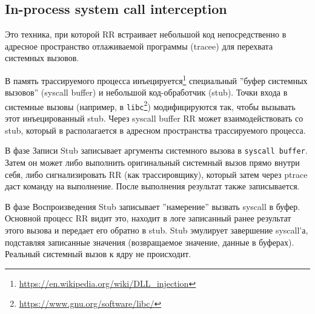 


\subsection{In-process system call interception}


Это техника, при которой RR встраивает небольшой код непосредственно
в адресное пространство отлаживаемой программы (tracee) для перехвата системных
вызовов.

В память трассируемого процесса
инъецируется\footnote{\url{https://en.wikipedia.org/wiki/DLL_injection}}
специальный ''буфер системных вызовов'' (syscall buffer) и небольшой
код-обработчик (stub). Точки входа в системные вызовы (например, в
\texttt{libc}\footnote{\url{https://www.gnu.org/software/libc/}})
модифицируются так, чтобы вызывать этот инъецированный stub. Через syscall
buffer RR может взаимодействовать со stub, который в располагается в адресном
пространства трассируемого процесса.

В фазе Записи Stub записывает аргументы системного вызова в \texttt{syscall
buffer}. Затем он может либо выполнить оригинальный системный вызов прямо
внутри себя, либо сигнализировать RR (как трассировщику), который затем через
ptrace даст команду на выполнение. После выполнения результат также
записывается.

В фазе Воспроизведения Stub записывает ''намерение'' вызвать syscall в буфер.
Основной процесс RR видит это, находит в логе записанный ранее результат этого
вызова и передает его обратно в stub. Stub эмулирует завершение syscall'а,
подставляя записанные значения (возвращаемое значение, данные в буферах).
Реальный системный вызов к ядру не происходит.

